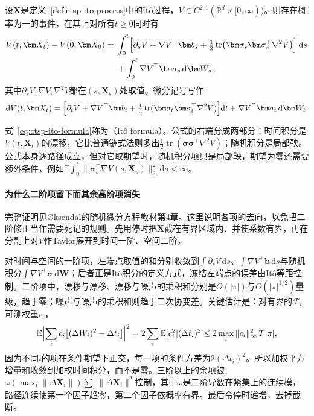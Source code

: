 \begin{theorem}[Itô公式]
  \label{thm:ctsp-ito-formula}
  设$\bm X$是定义~\ref{def:ctsp-ito-process}中的Itô过程，$V\in C^{2,1}(\mathbb R^d\times[0,\infty))$。则存在概率为一的事件，在其上对所有$t\geq0$同时有
  \begin{equation}
    \begin{aligned}
      V(t,\bm X_t)-V(0,\bm X_0)
      ={}&\int_0^t\Bigl[\partial_sV+\nabla V^\top\bm b_s+\tfrac12\operatorname{tr}\bigl(\bm\sigma_s\bm\sigma_s^\top\nabla^2V\bigr)\Bigr]\,\mathrm ds\\
      &+\int_0^t\nabla V^\top\bm\sigma_s\,\mathrm d\bm W_s ,
    \end{aligned}
    \label{eq:ctsp-ito-formula}
  \end{equation}
  其中$\partial_sV,\nabla V,\nabla^2V$都在$(s,\bm X_s)$处取值。微分记号写作
  \[
    \mathrm dV(t,\bm X_t)=\Bigl[\partial_tV+\nabla V^\top\bm b_t+\tfrac12\operatorname{tr}(\bm\sigma_t\bm\sigma_t^\top\nabla^2V)\Bigr]\mathrm dt+\nabla V^\top\bm\sigma_t\,\mathrm d\bm W_t .
  \]
\end{theorem}

式~\eqref{eq:ctsp-ito-formula}称为（Itô formula）。公式的右端分成两部分：时间积分是$V(t,\bm X_t)$的漂移，它比普通链式法则多出$\frac12\operatorname{tr}(\bm\sigma\bm\sigma^\top\nabla^2V)$；随机积分是局部鞅。公式本身逐路径成立，但对它取期望时，随机积分项只是局部鞅，期望为零还需要额外条件，例如$\mathbb E\int_0^t\|\bm\sigma_s^\top\nabla V(s,\bm X_s)\|_2^2\,\mathrm ds<\infty$。

\paragraph{为什么二阶项留下而其余高阶项消失}
完整证明见Øksendal的随机微分方程教材第4章。这里说明各项的去向，以免把二阶修正当作需要死记的规则。先用停时把$\bm X$截在有界区域内、并使系数有界，再在分割上对$V$作Taylor展开到时间一阶、空间二阶。

对时间与空间的一阶项，左端点取值的和分别收敛到$\int\partial_sV\,\mathrm ds$、$\int\nabla V^\top\bm b\,\mathrm ds$与随机积分$\int\nabla V^\top\bm\sigma\,\mathrm d\bm W$；后者正是Itô积分的定义方式，冻结左端点的误差由Itô等距控制。二阶项中，漂移与漂移、漂移与噪声的乘积和分别是$O(|\pi|)$与$O(|\pi|^{1/2})$量级，趋于零；噪声与噪声的乘积和则趋于二次协变差。关键估计是：对有界的$\mathcal F_{t_i}$可测权重$c_i$，
\[
  \mathbb E\Bigl|\sum_ic_i\bigl[(\Delta W_i)^2-\Delta t_i\bigr]\Bigr|^2=2\sum_i\mathbb E[c_i^2](\Delta t_i)^2\leq2\max_i\|c_i\|_\infty^2\,T|\pi| ,
\]
因为不同$i$的项在条件期望下正交，每一项的条件方差为$2(\Delta t_i)^2$。所以加权平方增量和收敛到加权时间积分，而不是零。三阶以上的余项被$\omega(\max_i\|\Delta\bm X_i\|)\sum_i\|\Delta\bm X_i\|^2$控制，其中$\omega$是二阶导数在紧集上的连续模，路径连续使第一个因子趋零，第二个因子依概率有界。最后令停时递增，去掉截断。

